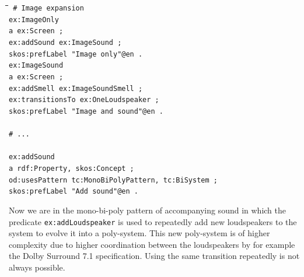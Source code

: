 \documentclass[11pt,a4paper]{article}
\newenvironment{code}{\tt \begin{tabbing}
\hskip12pt\=\hskip12pt\=\hskip12pt\=\hskip12pt\=\hskip5cm\=\hskip5cm\=\kill}
{\end{tabbing}}
\begin{document}
\begin{code}\tt
\# Image expansion\\
ex:ImageOnly\\
\> a ex:Screen ;\\
\> ex:addSound ex:ImageSound ;\\
\> skos:prefLabel "Image only"@en .\\
ex:ImageSound \\
\> a ex:Screen ; \\
\> ex:addSmell ex:ImageSoundSmell ;\\
\> ex:transitionsTo ex:OneLoudspeaker ;\\
\> skos:prefLabel "Image and sound"@en .\\
\\
\# ...\\
\\
ex:addSound\\
\> a rdf:Property, skos:Concept ;\\
\> od:usesPattern tc:MonoBiPolyPattern, tc:BiSystem ;\\
\> skos:prefLabel "Add sound"@en .\\
\end{code}

Now we are in the mono-bi-poly pattern of accompanying sound in which the predicate \texttt{ex:addLoudspeaker} is used to repeatedly add new loudspeakers to the system to evolve it into a poly-system. This new poly-system is of higher complexity due to higher coordination between the loudspeakers by for example the Dolby Surround 7.1 specification. Using the same transition repeatedly is not always possible.
\end{document}
